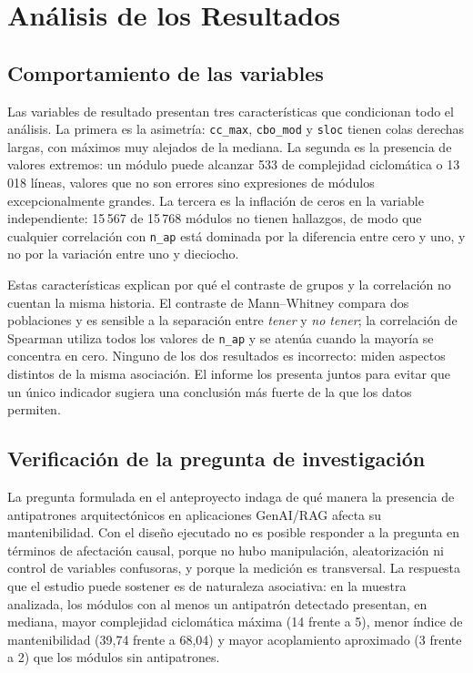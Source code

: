 \section{Análisis de los Resultados}

\subsection{Comportamiento de las variables}

Las variables de resultado presentan tres características que condicionan todo el análisis. La primera es la asimetría: \texttt{cc\_max}, \texttt{cbo\_mod} y \texttt{sloc} tienen colas derechas largas, con máximos muy alejados de la mediana. La segunda es la presencia de valores extremos: un módulo puede alcanzar 533 de complejidad ciclomática o 13\,018 líneas, valores que no son errores sino expresiones de módulos excepcionalmente grandes. La tercera es la inflación de ceros en la variable independiente: 15\,567 de 15\,768 módulos no tienen hallazgos, de modo que cualquier correlación con \texttt{n\_ap} está dominada por la diferencia entre cero y uno, y no por la variación entre uno y dieciocho.

Estas características explican por qué el contraste de grupos y la correlación no cuentan la misma historia. El contraste de Mann--Whitney compara dos poblaciones y es sensible a la separación entre \emph{tener} y \emph{no tener}; la correlación de Spearman utiliza todos los valores de \texttt{n\_ap} y se atenúa cuando la mayoría se concentra en cero. Ninguno de los dos resultados es incorrecto: miden aspectos distintos de la misma asociación. El informe los presenta juntos para evitar que un único indicador sugiera una conclusión más fuerte de la que los datos permiten.

\subsection{Verificación de la pregunta de investigación}

La pregunta formulada en el anteproyecto indaga de qué manera la presencia de antipatrones arquitectónicos en aplicaciones GenAI/RAG afecta su mantenibilidad. Con el diseño ejecutado no es posible responder a la pregunta en términos de afectación causal, porque no hubo manipulación, aleatorización ni control de variables confusoras, y porque la medición es transversal. La respuesta que el estudio puede sostener es de naturaleza asociativa: en la muestra analizada, los módulos con al menos un antipatrón detectado presentan, en mediana, mayor complejidad ciclomática máxima (14 frente a 5), menor índice de mantenibilidad (39,74 frente a 68,04) y mayor acoplamiento aproximado (3 frente a 2) que los módulos sin antipatrones.

